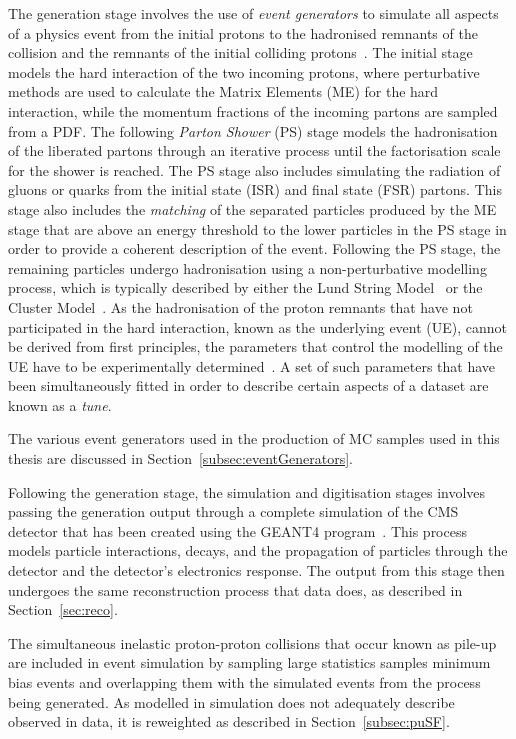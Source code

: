 The generation stage involves the use of \emph{event generators} to simulate all aspects of a physics event from the initial protons to the hadronised remnants of the collision and the remnants of the initial colliding protons~\cite{Buckley:2011ms,Hoche:2014rga}.
The initial stage models the hard interaction of the two incoming protons, where perturbative methods are used to calculate the Matrix Elements (ME) for the hard interaction, while the momentum fractions of the incoming partons are sampled from a PDF.
The following \emph{Parton Shower} (PS) stage models the hadronisation of the liberated partons through an iterative process until the factorisation scale for the shower is reached.
The PS stage also includes simulating the radiation of gluons or quarks from the initial state (ISR) and final state (FSR) partons.
This stage also includes the \emph{matching} of the separated particles produced by the ME stage that are above an energy threshold to the lower \pT particles in the PS stage in order to provide a coherent description of the event.
Following the PS stage, the remaining particles undergo hadronisation using a non-perturbative modelling process, which is typically described by either the Lund String Model~\cite{Andersson:1983ia} or the Cluster Model~\cite{Winter:2003tt}.
As the hadronisation of the proton remnants that have not participated in the hard interaction, known as the underlying event (UE), cannot be derived from first principles, the parameters that control the modelling of the UE have to be experimentally determined~\cite{Khachatryan:2015pea}.
A set of such parameters that have been simultaneously fitted in order to describe certain aspects of a dataset are known as a \emph{tune}.

The various event generators used in the production of MC samples used in this thesis are discussed in Section~\ref{subsec:eventGenerators}.

Following the generation stage, the simulation and digitisation stages involves passing the generation output through a complete simulation of the CMS detector that has been created using the GEANT4 program~\cite{geant4,Lefebure:1999wja}.
This process models particle interactions, decays, and the propagation of particles through the detector and the detector's electronics response.
The output from this stage then undergoes the same reconstruction process that data does, as described in Section~\ref{sec:reco}.

The simultaneous inelastic proton-proton collisions that occur known as pile-up are included in event simulation by sampling large statistics samples minimum bias events and overlapping them with the simulated events from the process being generated.
As \PU modelled in simulation does not adequately describe observed \PU in data, it is reweighted as described in Section~\ref{subsec:puSF}.

